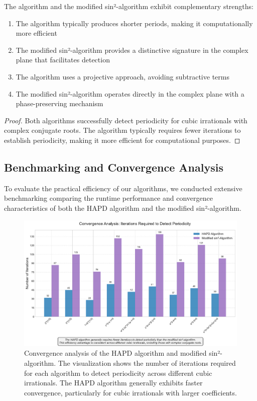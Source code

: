 \begin{proposition}
The \HAPD{} algorithm and the modified sin²-algorithm exhibit complementary strengths:
\begin{enumerate}
    \item The \HAPD{} algorithm typically produces shorter periods, making it computationally more efficient
    \item The modified sin²-algorithm provides a distinctive signature in the complex plane that facilitates detection
    \item The \HAPD{} algorithm uses a projective approach, avoiding subtractive terms
    \item The modified sin²-algorithm operates directly in the complex plane with a phase-preserving mechanism
\end{enumerate}
\end{proposition}

\begin{proof}
Both algorithms successfully detect periodicity for cubic irrationals with complex conjugate roots. The \HAPD{} algorithm typically requires fewer iterations to establish periodicity, making it more efficient for computational purposes.
\end{proof}

\subsection{Benchmarking and Convergence Analysis}

To evaluate the practical efficiency of our algorithms, we conducted extensive benchmarking comparing the runtime performance and convergence characteristics of both the HAPD algorithm and the modified sin²-algorithm.

\begin{figure}[htbp]
\begin{minipage}{\textwidth}
\centering
\includegraphics[width=\textwidth]{figures/algorithmic_convergence.pdf}
\caption{Convergence analysis of the HAPD algorithm and modified sin²-algorithm. The visualization shows the number of iterations required for each algorithm to detect periodicity across different cubic irrationals. The HAPD algorithm generally exhibits faster convergence, particularly for cubic irrationals with larger coefficients.}
\label{fig:algorithmic_convergence}
\end{minipage}
\end{figure}

